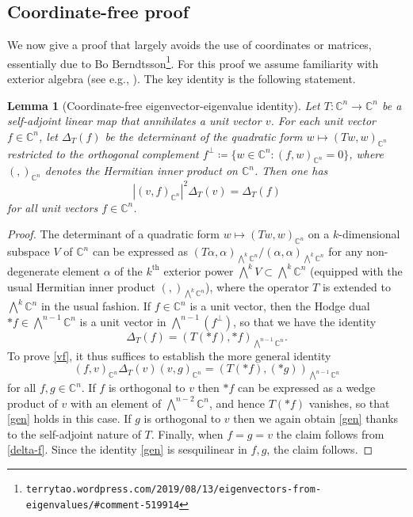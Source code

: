 \documentclass[12pt]{amsart}
\newcommand\C{\mathbb{C}}
\newtheorem{lemma}{Lemma}
\begin{document}
\subsection{Coordinate-free proof}\label{cfree-sec}

We now give a proof that largely avoids the use of coordinates or matrices, essentially due to Bo Berndtsson\footnote{\tt terrytao.wordpress.com/2019/08/13/eigenvectors-from-eigenvalues/\#comment-519914}.  For this proof we assume familiarity with exterior algebra (see e.g., \cite[Chapter XVI]{BM}).  The key identity is the following statement.

\begin{lemma}[Coordinate-free eigenvector-eigenvalue identity]\label{cfeei}  Let $T: \C^n \to \C^n$ be a self-adjoint linear map that annihilates a unit vector $v$.  For each unit vector $f \in \C^n$, let $\Delta_T(f)$ be the determinant of the quadratic form $w \mapsto (Tw, w)_{\C^n}$ restricted to the orthogonal complement $f^\perp \coloneqq \{ w \in \C^n: (f,w)_{\C^n} = 0 \}$, where $(,)_{\C^n}$ denotes the Hermitian inner product on $\C^n$.  Then one has
\begin{equation}\label{vf}
 |(v,f)_{\C^n}|^2 \Delta_T(v) = \Delta_T(f)
\end{equation}
for all unit vectors $f \in \C^n$.
\end{lemma}

\begin{proof} The determinant of a quadratic form $w \mapsto (Tw,w)_{\C^n}$ on a $k$-dimensional subspace $V$ of $\C^n$ can be expressed as $(T \alpha, \alpha)_{\bigwedge^k \C^n} / (\alpha, \alpha)_{\bigwedge^k \C^n}$ for any non-degenerate element $\alpha$ of the $k^{\mathrm{th}}$ exterior power $\bigwedge^k V \subset \bigwedge^k \C^n$ (equipped with the usual Hermitian inner product $(,)_{\bigwedge^k \C^n}$), where the operator $T$ is extended to $\bigwedge^k \C^n$ in the usual fashion.  If $f \in \C^n$ is a unit vector, then the Hodge dual $*f \in \bigwedge^{n-1} \C^n$ is a unit vector in $\bigwedge^{n-1} (f^\perp)$, so that we have the identity
\begin{equation}\label{delta-f}
 \Delta_T(f) = (T(*f), *f)_{\bigwedge^{n-1}\C^n}.
\end{equation}
To prove \eqref{vf}, it thus suffices to establish the more general identity
\begin{equation}\label{gen}
 (f,v)_{\C^n} \Delta_T(v) (v,g)_{\C^n} = (T(*f), (*g))_{\bigwedge^{n-1}\C^n}
\end{equation}
for all $f,g \in \C^n$.  If $f$ is orthogonal to $v$ then $*f$ can be expressed as a wedge product of $v$ with an element of $\bigwedge^{n-2}\C^n$, and hence $T(*f)$ vanishes, so that \eqref{gen} holds in this case.  If $g$ is orthogonal to $v$ then we again obtain \eqref{gen} thanks to the self-adjoint nature of $T$.  Finally, when $f=g=v$ the claim follows from \eqref{delta-f}.  Since the identity \eqref{gen} is sesquilinear in $f,g$, the claim follows.
\end{proof}
\end{document}
